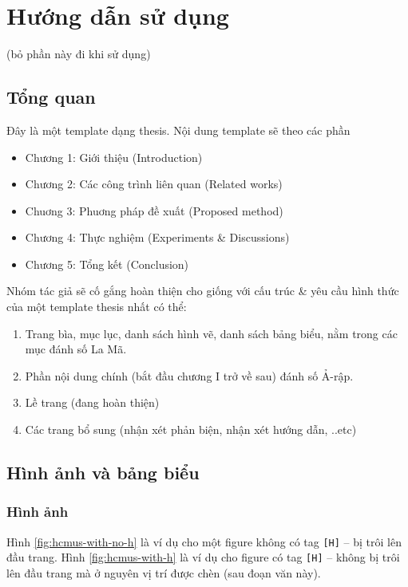 \chapter{Hướng dẫn sử dụng}

(bỏ phần này đi khi sử dụng)

\section{Tổng quan}
Đây là một template dạng thesis. Nội dung template sẽ theo các phần
\begin{itemize}
\item Chương 1: Giới thiệu (Introduction)
\item Chương 2: Các công trình liên quan (Related works)
\item Chuơng 3: Phuơng pháp đề xuất (Proposed method)
\item Chương 4: Thực nghiệm (Experiments \& Discussions)
\item Chương 5: Tổng kết (Conclusion)
\end{itemize}

Nhóm tác giả sẽ cố gắng hoàn thiện cho giống với cấu trúc \& yêu cầu hình thức của một template thesis nhất có thể:

\begin{enumerate}
\item Trang bìa, mục lục, danh sách hình vẽ, danh sách bảng biểu, nằm trong các mục đánh số La Mã.
\item Phần nội dung chính (bắt đầu chương I trở về sau) đánh số Ả-rập.
\item Lề trang (đang hoàn thiện)
\item Các trang bổ sung (nhận xét phản biện, nhận xét hướng dẫn, ..etc)
\end{enumerate}


\section{Hình ảnh và bảng biểu}

\subsection{Hình ảnh}

Hình \ref{fig:hcmus-with-no-h} là ví dụ cho một figure không có tag \texttt{[H]} -- bị trôi lên đầu trang. Hình \ref{fig:hcmus-with-h} là ví dụ cho figure có tag \texttt{[H]} -- không bị trôi lên đầu trang mà ở nguyên vị trí được chèn (sau đoạn văn này).

